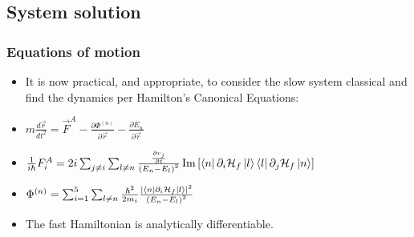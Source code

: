 \documentclass[aspectratio=169]{beamer}
\renewcommand{\va}{\vec}
\begin{document}
\subsection{System solution}
\begin{frame}
        \frametitle{Equations of motion}
        \begin{itemize}
                \item It is now practical, and appropriate, to consider the slow system
                        classical and find the dynamics per Hamilton's Canonical Equations:
                \item \(m\frac{d \va{r}}{d t^2} = \va{F}^A-\frac{\partial \Phi^{(n)}}{\partial
        \va{r}} - \frac{\partial E_n}{\partial \va{r}} \)
                \item \(\frac{1}{i\hbar{}}F_i^A = 2i\sum_{j\ne i} \sum_{l \ne n} \frac{\frac{\partial r_j}{\partial
        t}}{\pqty{E_n-E_l}^2} \Im \bqty{\bra{n}\partial_i \mathbb{\cal H}_f
        \ket{l}\bra{l}\partial_j\mathbb{\cal H}_f\ket{n}}
        \)
\item \(\Phi^{(n)} = \sum_{i=1}^{5} \sum_{l \ne n}
    \frac{\hbar{}^2}{2m_i}\frac{|\bra{n}\partial_i \mathbb{\cal H}_f\ket{l}|^2}{\pqty{E_n-E_l}^2}
    \)
\item The fast Hamiltonian is analytically differentiable.
        \end{itemize}
\end{frame}
\end{document}
